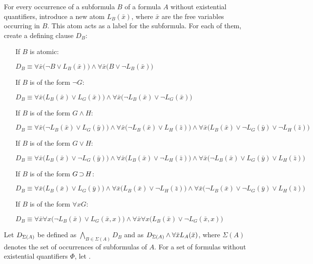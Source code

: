 \begin{defi}
	For every occurrence of a subformula $B$ of a formula $A$ without existential quantifiers, introduce a new atom $L_B(\bar x)$, where $\bar x$ are the free variables occurring in $B$.
	This atom acts as a label for the subformula. 
For each of them, create a defining clause $D_B$:

\begin{itemize}
	\item[If $B$ is atomic:]~

		$D_B\equiv \forall \bar x \big(\lnot B \lor L_B(\bar x)\big) \land \forall \bar x \big(B \lor \lnot L_B(\bar x)\big)  $
	\item[If $B$ is of the form $\lnot G$:]~

		$D_B\equiv \forall \bar x \big(L_B(\bar x) \lor L_G(\bar x)\big) \land \forall \bar x \big(\lnot L_B(\bar x) \lor \lnot L_G(\bar x)\big)$
	\item[If $B$ is of the form $G \land H$:]~

		$D_B\equiv \forall \bar x \big(\lnot L_B(\bar x) \lor L_G(\bar y)\big) \land \forall \bar x \big(\lnot L_B(\bar x) \lor L_H(\bar z)\big) \land \forall \bar x \big(L_B(\bar x) \lor \lnot L_G(\bar y) \lor \lnot L_H(\bar z)\big)  $
	\item[If $B$ is of the form $G \lor H$:]~

		$D_B\equiv \forall \bar x \big(L_B(\bar x) \lor \lnot L_G(\bar y)\big) \land \forall \bar x \big(L_B(\bar x) \lor \lnot L_H(\bar z)\big) \land \forall \bar x \big(\lnot L_B(\bar x) \lor L_G(\bar y) \lor L_H(\bar z)\big)$
	\item[If $B$ is of the form $G \operatorname{\supset} H$:]~

		$D_B\equiv \forall \bar x \big(L_B(\bar x) \lor L_G(\bar y)\big) \land
		\forall \bar x \big(L_B(\bar x) \lor \lnot L_H(\bar z)\big) \land \forall \bar x \big(\lnot L_B(\bar x) \lor \lnot L_G(\bar y) \lor L_H(\bar z)\big)  $
	\item[If $B$ is of the form $\forall x G$:]~

		$D_B\equiv \forall \bar x \forall x \big(\lnot L_B(\bar x) \lor L_G(\bar x, x)\big) \land \forall \bar x \forall x \big(L_B(\bar x) \lor \lnot L_G(\bar x, x)\big)$
\end{itemize}

Let $D_{\Sigma(A)}$ be defined as $\bigwedge_{B \in \Sigma(A)} D_B$ and
 as $D_{\Sigma(A)} \land \forall \bar x L_A(\bar x)$, where $\Sigma(A)$ denotes the set of occurrences of subformulas of $A$.
For a set of formulas without existential quantifiers $\Phi$, let .
\end{defi}

